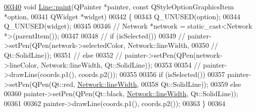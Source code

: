 \begin{DoxyCode}
\hypertarget{line_8cpp_source_l00340}{}\hyperlink{group___models_ga0aa64aed379d434be5942edf572b444b}{00340} \textcolor{keywordtype}{void} \hyperlink{group___models_ga0aa64aed379d434be5942edf572b444b}{Line::paint}(QPainter *painter, \textcolor{keyword}{const} QStyleOptionGraphicsItem *option,
00341                  QWidget *widget)
00342 \{
00343   Q\_UNUSED(option);
00344   Q\_UNUSED(widget);
00345 
00346 \textcolor{comment}{//  Network *network = static\_cast<Network *>(parentItem());}
00347 
00348 \textcolor{comment}{//  if (isSelected())}
00349 \textcolor{comment}{//    painter->setPen(QPen(network->selectedColor, Network::lineWidth,}
00350 \textcolor{comment}{//                         Qt::SolidLine));}
00351 \textcolor{comment}{//  else}
00352 \textcolor{comment}{//    painter->setPen(QPen(network->lineColor, Network::lineWidth, Qt::SolidLine));}
00353 
00354 \textcolor{comment}{//  painter->drawLine(coords.p1(), coords.p2());}
00355 
00356   \textcolor{keywordflow}{if} (isSelected())
00357     painter->setPen(QPen(Qt::red, \hyperlink{group___graphics_ga3f810634c9908d62d33a1ab09a76c147}{Network::lineWidth},
00358                          Qt::SolidLine));
00359   \textcolor{keywordflow}{else}
00360     painter->setPen(QPen(Qt::black, \hyperlink{group___graphics_ga3f810634c9908d62d33a1ab09a76c147}{Network::lineWidth}, Qt::SolidLine));
00361 
00362   painter->drawLine(coords.p1(), coords.p2());
00363 \}
00364 
\end{DoxyCode}
